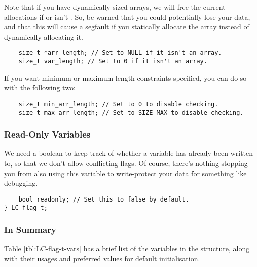 Note that if you have dynamically-sized arrays, we will free the current allocations if  or  isn't . So, be warned that you could potentially lose your data, and that this will cause a segfault if you statically allocate the array instead of dynamically allocating it.

\begin{verbatim}
	size_t *arr_length; // Set to NULL if it isn't an array.
	size_t var_length; // Set to 0 if it isn't an array.
\end{verbatim}

If you want minimum or maximum length constraints specified, you can do so with the following two:

\begin{verbatim}
	size_t min_arr_length; // Set to 0 to disable checking.
	size_t max_arr_length; // Set to SIZE_MAX to disable checking.
\end{verbatim}

\subsubsection{Read-Only Variables}

We need a boolean to keep track of whether a variable has already been written to, so that we don't allow conflicting flags. Of course, there's nothing stopping you from also using this variable to write-protect your data for something like debugging.

\begin{verbatim}
	bool readonly; // Set this to false by default.
} LC_flag_t;
\end{verbatim}

\subsubsection{In Summary}

Table \ref{tbl:LC-flag-t-vars} has a brief list of the variables in the  structure, along with their usages and preferred values for default initialisation.


